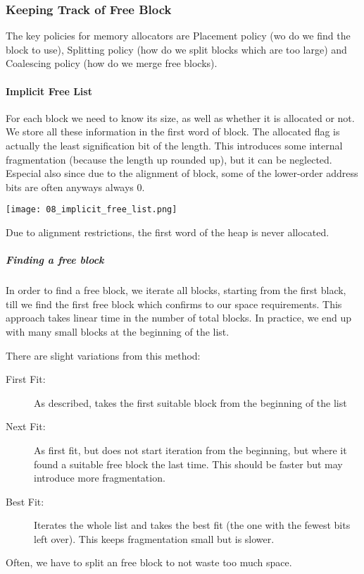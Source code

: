 \subsubsection{Keeping Track of Free Block}
The key policies for memory allocators are Placement policy (wo do we find the block to use), Splitting policy (how do we split blocks which are too large) and Coalescing policy (how do we merge free blocks).

\paragraph{Implicit Free List}
For each block we need to know its size, as well as whether it is allocated or not. We store all these information in the first word of block. The allocated flag is actually the least signification bit of the length. This introduces some internal fragmentation (because the length up rounded up), but it can be neglected. Especial also since due to the alignment of block, some of the lower-order address bits are often anyways always $0$.

\texttt{[image: 08\_implicit\_free\_list.png]}

Due to alignment restrictions, the first word of the heap is never allocated.

\subparagraph{Finding a free block}
In order to find a free block, we iterate all blocks, starting from the first black, till we find the first free block which confirms to our space requirements. This approach takes linear time in the number of total blocks. In practice, we end up with many small blocks at the beginning of the list.

There are slight variations from this method:
\begin{description}
    \item[First Fit:] As described, takes the first suitable block from the beginning of the list
    \item[Next Fit:] As first fit, but does not start iteration from the beginning, but where it found a suitable free block the last time. This should be faster but may introduce more fragmentation.
    \item[Best Fit:] Iterates the whole list and takes the best fit (the one with the fewest bits left over). This keeps fragmentation small but is slower.
\end{description}

Often, we have to split an free block to not waste too much space.

